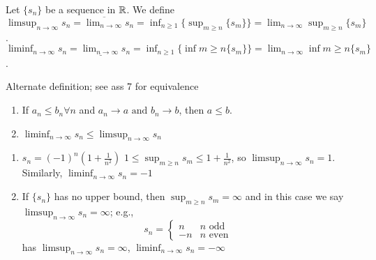 \begin{definition}
	\label{def:3.16}
	Let $\{ {s}_{n}\}$ be a sequence in $\mathbb{R}$. We define $\limsup_{n\to \infty }{s_{n}}=\overline{\lim_{n\to \infty } }s_n=\inf_{n\ge 1}\{\sup_{m\ge n}\{s_m\}\}=\lim_{n\to \infty }{\sup_{m\ge n}\{s_m\}}$.\\
	$\liminf_{n\to \infty }{s_{n}}=\underline{\lim_{n\to \infty} }s_n=\inf_{n\ge 1}\{\inf{m\ge n}\{s_m\}\}=\lim_{n\to \infty }{\inf{m\ge n}\{s_m\}}$.
	\begin{note}
		Alternate definition; see ass 7 for equivalence
	\end{note}
	\begin{remark}
		\begin{enumerate}
			\item
			      If $a_{n}\le b_{n} \forall n$ and $a_{n}\to a \text{ and } b_{n}\to b$, then $a\le b$.
			\item $\liminf_{n\to \infty }s_n \le \limsup_{n\to \infty }s_{n}$
		\end{enumerate}
	\end{remark}
\end{definition}

\begin{example}
	\begin{enumerate}
		\item $s_{n}=(-1)^{n}(1+\frac{1}{n^2})$
		      $1\le \sup_{m\ge n}{s_{m}}\le 1+\frac{1}{n^2}$, so $\limsup_{n\to \infty }{s_{n}}=1$. Similarly, $\liminf_{n\to \infty }{s_{n}}=-1$
		\item If $\{ {s}_{n}\}$ has no upper bound, then $\sup_{m\ge n}{s_m}=\infty $ and in this case we say $\limsup_{n\to \infty}{s_{n}}=\infty $; e.g.,
		      \[
			      s_n=
			      \begin{cases}
				      n  & n\text{ odd }  \\
				      -n & n\text{ even }
			      \end{cases}
		      \]
		      has
		      $\limsup_{n\to \infty}{s_{n}}=\infty $,
		      $\liminf_{n\to \infty}{s_{n}}=-\infty $
	\end{enumerate}
\end{example}

